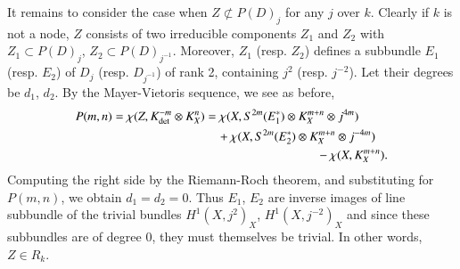 It remains to consider the case when $Z\nsubset P(D)_{j}$ for any $j$
over $k$. Clearly if $k$ is not a node, $Z$ consists of two
irreducible components $Z_{1}$ and $Z_{2}$ with $Z_{1}\subset
P(D)_{j}$, $Z_{2}\subset P(D)_{j^{-1}}$. Moreover, $Z_{1}$
(resp. $Z_{2}$) defines a subbundle $E_{1}$ (resp. $E_{2}$) of $D_{j}$
(resp. $D_{j^{-1}}$) of rank 2, containing $j^{2}$ (resp. $j^{-2}$). Let
their degrees be $d_{1}$, $d_{2}$. By the Mayer-Vietoris sequence, we
see as before,
\begin{align*}
P(m,n)=\chi(Z,K^{-m}_{\det}\otimes K^{n}_{X})
&= \chi(X,S^{2m}(E^{*}_{1})\otimes K^{m+n}_{X}\otimes j^{4m})\\
&\quad +\chi(X,S^{2m}(E^{*}_{2})\otimes K^{m+n}_{X}\otimes j^{-4m})\\
&\qquad\hspace{2.45cm} -\chi (X,K^{m+n}_{X}).
\end{align*}
Computing the right side by the Riemann-Roch theorem, and substituting
for $P(m,n)$, we obtain $d_{1}=d_{2}=0$. Thus $E_{1}$, $E_{2}$ are
inverse images of line subbundle of the trivial bundles
$H^{1}(X,j^{2})_{X}$, $H^{1}(X,j^{-2})_{X}$ and since these subbundles
are of degree $0$, they must themselves be trivial. In other words,
$Z\in R_{k}$. 

